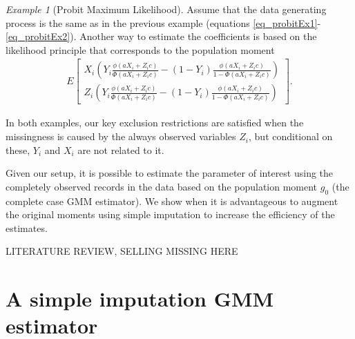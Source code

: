 \documentclass{article}
\theoremstyle{definition}
\theoremstyle{remark}
\newtheorem{example}{Example}
\begin{document}
\begin{example}[Probit Maximum Likelihood]
	Assume that the data generating process is the same as in the previous example (equations \eqref{eq_probitEx1}-\eqref{eq_probitEx2}). Another way to estimate the coefficients is based on the likelihood principle that corresponds to the population moment
	\begin{align*}
	E\left[\begin{array}{c}
	X_i\left(Y_i \frac{\phi(aX_i+Z_ic)}{\Phi(aX_i+Z_ic)} - (1-Y_i)\frac{\phi(aX_i+Z_ic)}{1-\Phi(aX_i+Z_ic)}\right) \\
	Z_i\left(Y_i \frac{\phi(aX_i+Z_ic)}{\Phi(aX_i+Z_ic)} - (1-Y_i)\frac{\phi(aX_i+Z_ic)}{1-\Phi(aX_i+Z_ic)}\right)
	\end{array}
	\right].
	\end{align*}
\end{example}
In both examples, our key exclusion restrictions are satisfied when the missingness is caused by the always observed variables $Z_i$, but conditional on these, $Y_i$ and $X_i$ are not related to it.

Given our setup, it is possible to estimate the parameter of interest using the completely observed records in the data based on the population moment $g_0$ (the complete case GMM estimator). We show when it is advantageous to augment the original moments using simple imputation to increase the efficiency of the estimates. 

{\color{red} LITERATURE REVIEW, SELLING MISSING HERE}

\section{A simple imputation GMM estimator}
\end{document}
